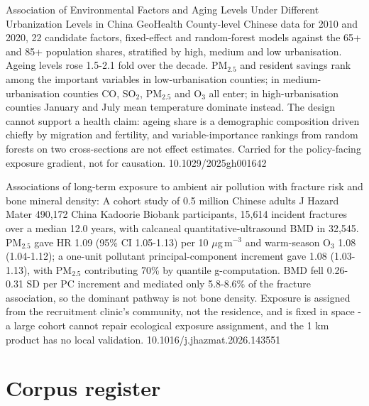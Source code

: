 \documentclass[10pt]{article}
\begin{document}

{Association of Environmental Factors and Aging Levels Under Different Urbanization Levels in China}
{GeoHealth}
{County-level Chinese data for 2010 and 2020, 22 candidate factors, fixed-effect and random-forest models against the 65+ and 85+ population shares, stratified by high, medium and low urbanisation. Ageing levels rose 1.5-2.1 fold over the decade. PM$_{2.5}$ and resident savings rank among the important variables in low-urbanisation counties; in medium-urbanisation counties CO, SO$_2$, PM$_{2.5}$ and O$_3$ all enter; in high-urbanisation counties January and July mean temperature dominate instead. The design cannot support a health claim: ageing share is a demographic composition driven chiefly by migration and fertility, and variable-importance rankings from random forests on two cross-sections are not effect estimates. Carried for the policy-facing exposure gradient, not for causation.}
{10.1029/2025gh001642}

\clearpage


{Associations of long-term exposure to ambient air pollution with fracture risk and bone mineral density: A cohort study of 0.5 million Chinese adults}
{J Hazard Mater}
{490,172 China Kadoorie Biobank participants, 15,614 incident fractures over a median 12.0 years, with calcaneal quantitative-ultrasound BMD in 32,545. PM$_{2.5}$ gave HR 1.09 (95\% CI 1.05-1.13) per 10 $\mu$g\,m$^{-3}$ and warm-season O$_3$ 1.08 (1.04-1.12); a one-unit pollutant principal-component increment gave 1.08 (1.03-1.13), with PM$_{2.5}$ contributing 70\% by quantile g-computation. BMD fell 0.26-0.31 SD per PC increment and mediated only 5.8-8.6\% of the fracture association, so the dominant pathway is not bone density. Exposure is assigned from the recruitment clinic's community, not the residence, and is fixed in space - a large cohort cannot repair ecological exposure assignment, and the 1 km product has no local validation.}
{10.1016/j.jhazmat.2026.143551}

\clearpage

\section*{\sffamily\bfseries\color{Deep}Corpus register}
\vspace{-1.5mm}{\color{Amber}\rule{\linewidth}{1.1pt}}\vspace{2.5mm}
\end{document}
